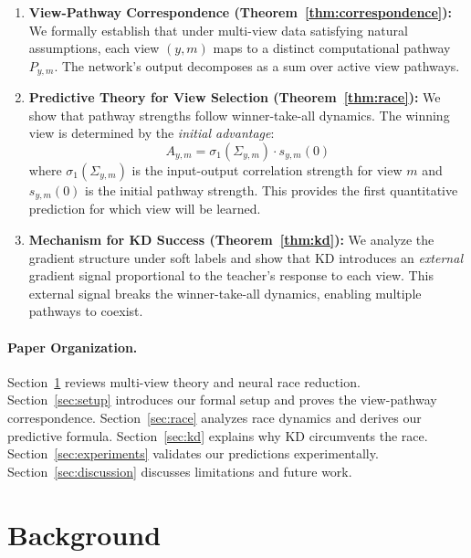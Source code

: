 \documentclass{article}
\begin{document}
\begin{enumerate}
    \item \textbf{View-Pathway Correspondence (Theorem~\ref{thm:correspondence}):} We formally establish that under multi-view data satisfying natural assumptions, each view $(y, m)$ maps to a distinct computational pathway $P_{y,m}$. The network's output decomposes as a sum over active view pathways.

    \item \textbf{Predictive Theory for View Selection (Theorem~\ref{thm:race}):} We show that pathway strengths follow winner-take-all dynamics. The winning view is determined by the \emph{initial advantage}:
    \begin{equation}
        A_{y,m} = \sigma_1(\Sigma_{y,m}) \cdot s_{y,m}(0)
    \end{equation}
    where $\sigma_1(\Sigma_{y,m})$ is the input-output correlation strength for view $m$ and $s_{y,m}(0)$ is the initial pathway strength. This provides the first quantitative prediction for which view will be learned.

    \item \textbf{Mechanism for KD Success (Theorem~\ref{thm:kd}):} We analyze the gradient structure under soft labels and show that KD introduces an \emph{external} gradient signal proportional to the teacher's response to each view. This external signal breaks the winner-take-all dynamics, enabling multiple pathways to coexist.
\end{enumerate}

\paragraph{Paper Organization.} Section~\ref{sec:background} reviews multi-view theory and neural race reduction. Section~\ref{sec:setup} introduces our formal setup and proves the view-pathway correspondence. Section~\ref{sec:race} analyzes race dynamics and derives our predictive formula. Section~\ref{sec:kd} explains why KD circumvents the race. Section~\ref{sec:experiments} validates our predictions experimentally. Section~\ref{sec:discussion} discusses limitations and future work.

\section{Background}
\label{sec:background}
\end{document}
